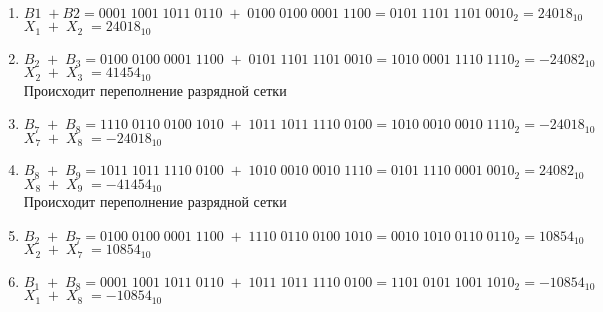 \documentclass{article}
\begin{document}
\begin{enumerate}
  \item $ B1 \; +  B2 = 0001 \; 1001 \; 1011 \; 0110 \; + \; 0100 \; 0100 \; 0001 \; 1100 = 0101 \; 1101 \; 1101 \; 0010 _{2} = 24018_{10}  $ \\
  $ X_{1} \; + \; X_{2} \; = 24018_{10} $
  \item $ B_{2} \; + \; B_{3} = 0100 \; 0100 \; 0001 \; 1100 \; + \; 0101 \; 1101 \; 1101 \; 0010 = 1010 \; 0001 \; 1110 \; 1110_{2} = -24082_{10}  $ \\
  $ X_{2} \; + \; X_{3} \; = 41454_{10} $ \\
  Происходит переполнение разрядной сетки
  \item $ B_{7} \; + \; B_{8} = 1110 \; 0110 \; 0100 \; 1010 \; + \; 1011 \; 1011 \; 1110 \; 0100 = 1010 \; 0010 \; 0010 \; 1110_{2} = -24018_{10}  $ \\
  $ X_{7} \; + \; X_{8} \; = -24018_{10} $
  \item $ B_{8} \; + \; B_{9} = 1011 \; 1011 \; 1110 \; 0100 \; + \; 1010 \; 0010 \; 0010 \; 1110 = 0101 \; 1110 \; 0001 \; 0010_{2} = 24082_{10} $ \\
  $ X_{8} \; + \; X_{9} \; = -41454_{10} $ \\
  Происходит переполнение разрядной сетки 
  \item $ B_{2} \; + \; B_{7} = 0100 \; 0100 \; 0001 \; 1100 \; + \; 1110 \; 0110 \; 0100 \; 1010 = 0010 \; 1010 \; 0110 \; 0110_{2} = 10854_{10} $ \\
  $ X_{2} \; + \; X_{7} \; = 10854_{10} $
  \item $ B_{1} \; + \; B_{8} = 0001 \; 1001 \; 1011 \; 0110 \; + \; 1011 \; 1011 \; 1110 \; 0100 = 1101 \; 0101 \; 1001 \; 1010_{2} = -10854_{10} $ \\
  $ X_{1} \; + \; X_{8} \; = -10854_{10} $
\end{enumerate}
\end{document}
